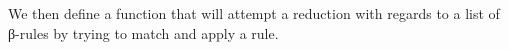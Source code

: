 \begin{code}
%
\\[\AgdaEmptyExtraSkip]%
%
\>[2]%
\>[12]\AgdaSymbol{:}%
\>[15]\AgdaSpace{}%
\AgdaSymbol{\{}\AgdaSymbol{\}}\AgdaSpace{}%
\AgdaSpace{}%
\AgdaSpace{}%
\AgdaSpace{}%
\<%
\\
%
\>[2]\AgdaSpace{}%
\<%
\\
\>[2][@{}l@{\AgdaIndent{0}}]%
\>[4]\AgdaSymbol{=}\AgdaSpace{}%
\AgdaSpace{}%
\AgdaSpace{}%
\AgdaSpace{}%
\AgdaSpace{}%
\AgdaSpace{}%
\AgdaSpace{}%
\<%
\\
\>[0]\AgdaSpace{}%
\<%
\end{code}
We then define a function that will attempt a reduction with regards
to a list of β-rules by trying to match and apply a rule.
